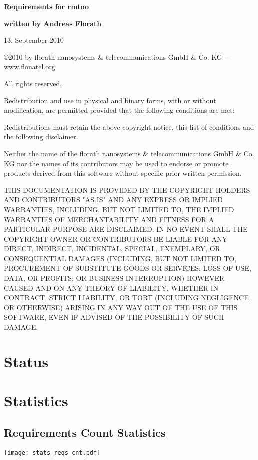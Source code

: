 \documentclass{report}
\begin{document}
\thispagestyle{empty}

\mbox{}

\vfill

{\LARGE\textbf{Requirements for rmtoo}}

\vfill

{\Large\textbf{written by Andreas Florath}}

\vfill

13. September 2010

\vfill

\newpage

\mbox{}

\vfill

{\small

\copyright 2010 by florath nanosystems \& telecommunications GmbH \& Co. KG
--- www.flonatel.org 

All rights reserved.

Redistribution and use in physical and binary forms, with or without
modification, are permitted provided that the following conditions are
met:

Redistributions must retain the above copyright notice, this list of
conditions and the following disclaimer.

Neither the name of the florath nanosystems \& telecommunications GmbH
\& Co. KG nor the names of its contributors may be used to endorse or
promote products derived from this software without specific prior
written permission.

THIS DOCUMENTATION IS PROVIDED BY THE COPYRIGHT HOLDERS AND
CONTRIBUTORS "AS IS" AND ANY EXPRESS OR IMPLIED WARRANTIES, INCLUDING,
BUT NOT LIMITED TO, THE IMPLIED WARRANTIES OF MERCHANTABILITY AND
FITNESS FOR A PARTICULAR PURPOSE ARE DISCLAIMED. IN NO EVENT SHALL THE
COPYRIGHT OWNER OR CONTRIBUTORS BE LIABLE FOR ANY DIRECT, INDIRECT,
INCIDENTAL, SPECIAL, EXEMPLARY, OR CONSEQUENTIAL DAMAGES (INCLUDING,
BUT NOT LIMITED TO, PROCUREMENT OF SUBSTITUTE GOODS OR SERVICES; LOSS
OF USE, DATA, OR PROFITS; OR BUSINESS INTERRUPTION) HOWEVER CAUSED AND
ON ANY THEORY OF LIABILITY, WHETHER IN CONTRACT, STRICT LIABILITY, OR
TORT (INCLUDING NEGLIGENCE OR OTHERWISE) ARISING IN ANY WAY OUT OF THE
USE OF THIS SOFTWARE, EVEN IF ADVISED OF THE POSSIBILITY OF SUCH
DAMAGE.
}
\newpage

\tableofcontents

\newpage

\chapter{Status}




\chapter{Statistics}
\section{Requirements Count Statistics}
\texttt{[image: stats\_reqs\_cnt.pdf]}
\end{document}
